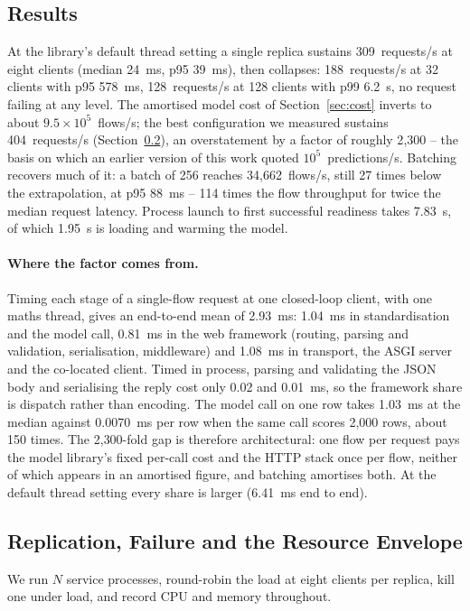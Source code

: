 \documentclass{llncs}
\begin{document}
\subsection{Results}
\label{sec:servingresults}
At the library's default thread setting a single replica sustains
309~requests/s at eight clients (median 24~ms, p95 39~ms), then collapses:
188~requests/s at 32 clients with p95 578~ms, 128~requests/s at 128 clients
with p99 6.2~s, no request failing at any level. The amortised model cost
of Section~\ref{sec:cost} inverts to about $9.5\times10^{5}$~flows/s; the
best configuration we measured sustains 404~requests/s
(Section~\ref{sec:replication}), an overstatement by a factor of roughly
2{,}300 -- the basis on which an earlier version of this work quoted
$10^{5}$~predictions/s. Batching recovers much of it: a batch of 256 reaches
34{,}662~flows/s, still 27 times below the extrapolation, at p95 88~ms -- 114
times the flow throughput for twice the median request latency. Process
launch to first successful readiness takes 7.83~s, of which 1.95~s is
loading and warming the model.

\paragraph{Where the factor comes from.} Timing each stage of a single-flow
request at one closed-loop client, with one maths thread, gives an end-to-end
mean of 2.93~ms: 1.04~ms in standardisation and the model call, 0.81~ms in the
web framework (routing, parsing and validation, serialisation, middleware)
and 1.08~ms in transport, the ASGI server and the co-located client. Timed in
process, parsing and validating the JSON body and serialising the reply cost
only 0.02 and 0.01~ms, so the framework share is dispatch rather than
encoding. The model call on one row takes 1.03~ms at the median against
0.0070~ms per row when the same call scores 2{,}000 rows, about 150 times.
The 2{,}300-fold gap is therefore architectural: one flow per request pays
the model library's fixed per-call cost and the HTTP stack once per flow,
neither of which appears in an amortised figure, and batching amortises both.
At the default thread setting every share is larger (6.41~ms end to end).

\subsection{Replication, Failure and the Resource Envelope}
\label{sec:replication}
We run $N$ service processes, round-robin the load at eight clients per
replica, kill one under load, and record CPU and memory throughout.
\end{document}
